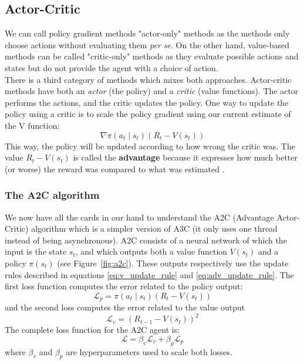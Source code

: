 \subsection{Actor-Critic}
We can call policy gradient methods "actor-only" methods as the methods
only choose actions without evaluating them \textit{per se}. On the other
hand, value-based methods can be called "critic-only" methods as they
evaluate possible actions and states but do not provide the agent
with a choice of action.\\

There is a third category of methods which mixes both approaches. 
Actor-critic methods \cite{suttonbarto} have both an \textit{actor} (the policy) and a
\textit{critic} (value functions). The actor performs the actions, and the 
critic updates the policy. One way to update the policy using a critic is to
scale the policy gradient using our current estimate of the V function:
\begin{equation}
	\label{eq:adv_update_rule}
\nabla \pi(a_t \mid s_t) (R_t - V(s_t))
\end{equation}
This way, the policy will be updated according to how wrong the critic was.
The value $R_t - V(s_t)$ is called the \textbf{advantage} 
because it expresses how much better (or worse) the reward was compared to 
what was estimated \cite{advantage, a3c}.


\subsubsection{The A2C algorithm}
We now have all the cards in our hand to understand the A2C
(Advantage Actor-Critic) algorithm which is a simpler version of A3C \cite{a3c}
(it only uses one thread instead of being asynchronous). 
A2C consists of a neural network
of which the input is the state $s_t$, and which outputs both a value function
$V(s_t)$ and a policy $\pi(s_t)$ (see Figure~\ref{fig:a2c}). These outputs
respectively use the update rules described in equations \ref{eq:v_update_rule}
and \ref{eq:adv_update_rule}. The first loss function computes the error
related to the policy output:
$$ \mathcal{L}_p = \pi(a_t \mid s_t) (R_t - V(s_t))$$
and the second loss computes the error related to the value output
$$ \mathcal{L}_v = (R_{t-1} - V(s_t))^2$$
The complete loss function for the A2C agent is:
$$ \mathcal{L} = \beta_v \mathcal{L}_v + \beta_p \mathcal{L}_p $$
where $\beta_v$ and $\beta_p$ are hyperparameters used to scale both losses.\\

